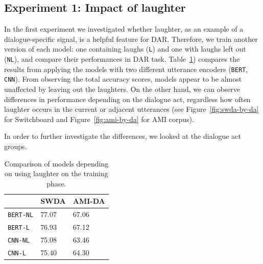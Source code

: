 \documentclass[11pt,a4paper]{article}
\begin{document}
\subsection{Experiment 1: Impact of laughter} \label{sec:experiment1}   %
In the first experiment we investigated whether laughter, as an example of a dialogue-specific signal, is a helpful feature for DAR.
Therefore, we train another version of each model: one containing laughs (\texttt{L}) and one with laughs left out (\texttt{NL}), and compare their performances in DAR task.
Table~\ref{table:laughter-total-acc}) compares the results from applying the models with two different utterance encoders (\texttt{BERT}, \texttt{CNN}). From observing the total accuracy scores, models appear to be almost unaffected by leaving out the laughters. On the other hand, we can observe differences in performance depending on the dialogue act, regardless how often laughter occurs in the current or adjacent utterances (see Figure~\ref{fig:swda-by-da} for Switchboard and Figure~\ref{fig:ami-by-da} for AMI corpus).

In order to further investigate the differences, we looked at the dialogue act groups.
\begin{table}
  \centering
  \begin{tabular}{@{}lll@{}}
    \toprule
                      & SWDA  & AMI-DA   \\ \midrule
    \texttt{BERT-NL}  & 77.07 & 67.06       \\ 
    \texttt{BERT-L}   & 76.93 & 67.12       \\ \midrule
    \texttt{CNN-NL}   & 75.08 & 63.46        \\
    \texttt{CNN-L}    & 75.40 & 64.30        \\ \bottomrule
    
  \end{tabular}
  \caption{Comparison of models depending on using laughter on the training phase. }
  \label{table:laughter-total-acc}
\end{table}

\end{document}

